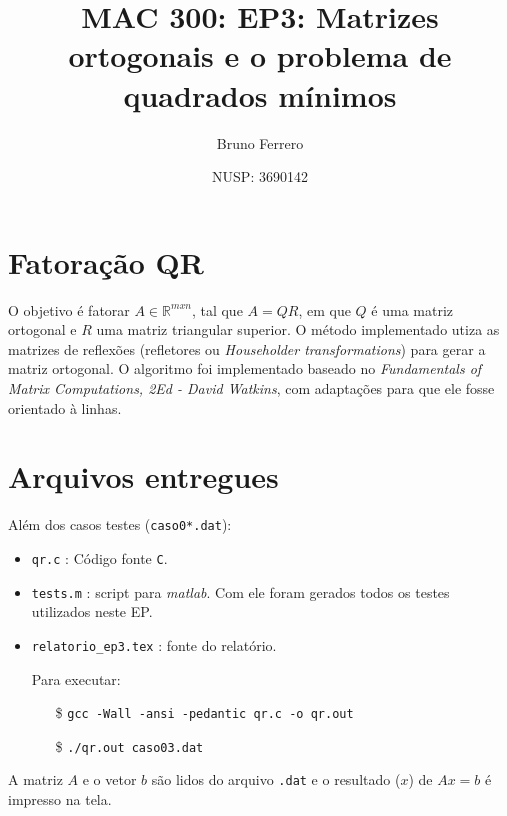 \documentclass[a4paper,11pt]{article}
\title{MAC 300: EP3: Matrizes ortogonais e o problema de quadrados mínimos}
\author{Bruno Ferrero}
\date{NUSP: 3690142}
\begin{document}
\maketitle

\section*{Fatoração QR}
O objetivo é fatorar $ A  \in  \mathbb{R}^{mxn} $, tal que $A = QR$, em que $Q$ é uma matriz ortogonal e $R$ uma matriz triangular superior. O método implementado utiza as matrizes de reflexões (refletores ou \textit{Householder transformations}) para gerar a matriz ortogonal. O algoritmo foi implementado baseado no \textit{Fundamentals of Matrix Computations, 2Ed - David Watkins}, com adaptações para que ele fosse orientado à linhas. 

\section*{Arquivos entregues}

Além dos casos testes (\texttt{caso0*.dat}):

\begin{itemize}
\item \texttt{qr.c} : Código fonte \texttt{C}.
\item \texttt{tests.m} : script para \textit{matlab}. Com ele foram gerados todos os testes utilizados neste EP.
\item \texttt{relatorio\_ep3.tex} : fonte do relatório.

Para executar:
\begin{itemize}
\item[\$] \texttt{gcc -Wall -ansi -pedantic qr.c -o qr.out}
\item[\$] \texttt{./qr.out caso03.dat}
\end{itemize}
\end{itemize}

A matriz $A$ e o vetor $b$ são lidos do arquivo \texttt{.dat} e o resultado ($x$) de $Ax=b$ é impresso na tela.
\end{document}
